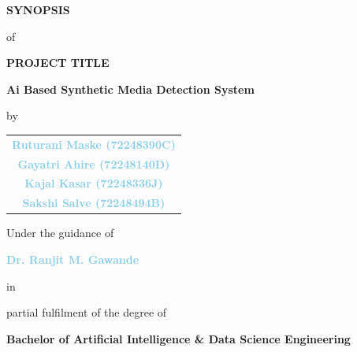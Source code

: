 \documentclass[12pt,a4paper,oneside]{report}
\begin{document}
\begin{titlepage}

\begin{center}

\vspace*{-1cm}

{\Large\bfseries
SYNOPSIS
}

\vspace{0.5cm}

{\large
of
}

\vspace{0.5cm}

{\LARGE\bfseries
PROJECT TITLE
}

\vspace{0.4cm}

{\Large\bfseries
Ai Based Synthetic Media Detection System
}

\vspace{0.1cm}

{\large
by
}

\vspace{0.2cm}

\begin{tabular}{c}
\textcolor{skyblue}{\textbf{Ruturani Maske (72248390C)}} \\[0.2cm]
\textcolor{skyblue}{\textbf{Gayatri Ahire (72248140D)}} \\[0.2cm]
\textcolor{skyblue}{\textbf{Kajal Kasar (72248336J)}} \\[0.2cm]
\textcolor{skyblue}{\textbf{Sakshi Salve (72248494B)}}
\end{tabular}

\vspace{1cm}

{\large
Under the guidance of
}

\vspace{0.3cm}

{\large
\textcolor{skyblue}{\textbf{Dr. Ranjit M. Gawande}}
}

\vspace{0.3cm}

{\large
in
}

\vspace{0.3cm}

{\large
partial fulfilment of the degree of
}

\vspace{0.3cm}

{\large\bfseries
Bachelor of Artificial Intelligence \& Data Science Engineering
}


\end{center}
\end{titlepage}
\end{document}
